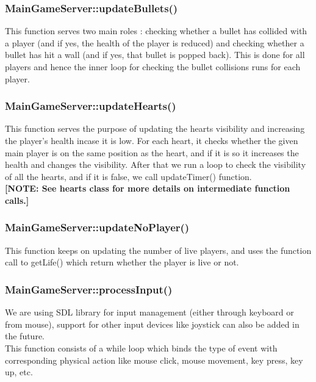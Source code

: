 \documentclass{article}
\begin{document}
\subsubsection{MainGameServer::updateBullets() }
This function serves two main roles : checking whether a bullet has collided with a player (and if yes, the health of the player is reduced) and checking whether a bullet has hit a wall (and if yes, that bullet is popped back). This is done for all players and hence the inner loop for checking the bullet collisions runs for each player.
\newline

\subsubsection{MainGameServer::updateHearts()}
This function serves the purpose of updating the hearts visibility and increasing the player’s health incase it is low. For each heart, it checks whether the given main player is on the same position as the heart, and if it is so it increases the health and changes the visibility. After that we run a loop to check the visibility of all the hearts, and if it is false, we call updateTimer() function. \\
\newline
\textbf{[NOTE: See hearts class for more details on intermediate function calls.]}
\newline

\subsubsection{MainGameServer::updateNoPlayer()}
This function keeps on updating the number of live players, and uses the function call to getLife() which return whether the player is live or not.
\newline

\subsubsection{MainGameServer::processInput() }
We are using SDL library for input management (either through keyboard or from mouse), support for other input devices like joystick can also be added in the future. \\

This function consists of a while loop which binds the type of event with corresponding physical action like mouse click, mouse movement, key press, key up, etc. \\
\end{document}
